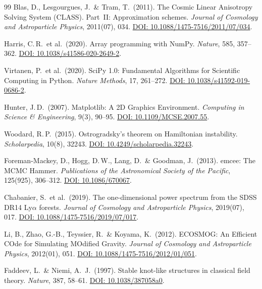 \documentclass[aps,prd,twocolumn,superscriptaddress,nofootinbib]{revtex4-2}
\begin{document}
\begin{thebibliography}{99}
Blas, D., Lesgourgues, J.\ \& Tram, T.\ (2011).
The Cosmic Linear Anisotropy Solving System (CLASS). Part~II: Approximation schemes.
\textit{Journal of Cosmology and Astroparticle Physics}, 2011(07), 034.
\href{https://doi.org/10.1088/1475-7516/2011/07/034}{DOI: 10.1088/1475-7516/2011/07/034}.

Harris, C.\,R.\ et al.\ (2020).
Array programming with NumPy.
\textit{Nature}, 585, 357--362.
\href{https://doi.org/10.1038/s41586-020-2649-2}{DOI: 10.1038/s41586-020-2649-2}.

Virtanen, P.\ et al.\ (2020).
SciPy 1.0: Fundamental Algorithms for Scientific Computing in Python.
\textit{Nature Methods}, 17, 261--272.
\href{https://doi.org/10.1038/s41592-019-0686-2}{DOI: 10.1038/s41592-019-0686-2}.

Hunter, J.\,D.\ (2007).
Matplotlib: A 2D Graphics Environment.
\textit{Computing in Science \& Engineering}, 9(3), 90--95.
\href{https://doi.org/10.1109/MCSE.2007.55}{DOI: 10.1109/MCSE.2007.55}.

Woodard, R.\,P.\ (2015).
Ostrogradsky's theorem on Hamiltonian instability.
\textit{Scholarpedia}, 10(8), 32243.
\href{https://doi.org/10.4249/scholarpedia.32243}{DOI: 10.4249/scholarpedia.32243}.

Foreman-Mackey, D., Hogg, D.\,W., Lang, D.\ \& Goodman, J.\ (2013).
emcee: The MCMC Hammer.
\textit{Publications of the Astronomical Society of the Pacific}, 125(925), 306--312.
\href{https://doi.org/10.1086/670067}{DOI: 10.1086/670067}.

Chabanier, S.\ et al.\ (2019).
The one-dimensional power spectrum from the SDSS DR14 Ly$\alpha$ forests.
\textit{Journal of Cosmology and Astroparticle Physics}, 2019(07), 017.
\href{https://doi.org/10.1088/1475-7516/2019/07/017}{DOI: 10.1088/1475-7516/2019/07/017}.

Li, B., Zhao, G.-B., Teyssier, R.\ \& Koyama, K.\ (2012).
ECOSMOG: An Efficient COde for Simulating MOdified Gravity.
\textit{Journal of Cosmology and Astroparticle Physics}, 2012(01), 051.
\href{https://doi.org/10.1088/1475-7516/2012/01/051}{DOI: 10.1088/1475-7516/2012/01/051}.

Faddeev, L.\ \& Niemi, A.~J.\ (1997).
Stable knot-like structures in classical field theory.
\textit{Nature}, 387, 58--61.
\href{https://doi.org/10.1038/387058a0}{DOI: 10.1038/387058a0}.


\end{thebibliography}
\end{document}
